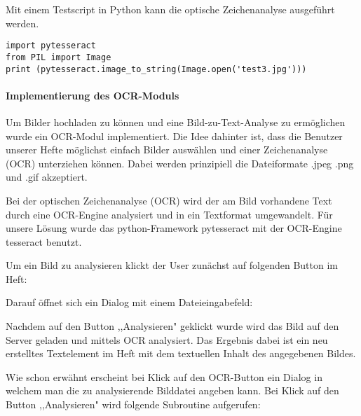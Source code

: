 Mit einem Testscript in Python kann die optische Zeichenanalyse ausgeführt werden.

\begin{lstlisting}[caption={pytesseract-Code}]
import pytesseract
from PIL import Image
print (pytesseract.image_to_string(Image.open('test3.jpg')))
\end{lstlisting}

\paragraph{Implementierung des OCR-Moduls}
Um Bilder hochladen zu können und eine Bild-zu-Text-Analyse zu ermöglichen wurde ein OCR-Modul implementiert. Die Idee dahinter ist, dass die Benutzer unserer Hefte möglichst einfach Bilder auswählen und einer Zeichenanalyse (OCR) unterziehen können. Dabei werden prinzipiell die Dateiformate .jpeg .png und .gif akzeptiert.

Bei der optischen Zeichenanalyse (OCR) wird der am Bild vorhandene Text durch eine OCR-Engine analysiert und in ein Textformat umgewandelt. Für unsere Lösung wurde das python-Framework pytesseract mit der OCR-Engine tesseract benutzt.

Um ein Bild zu analysieren klickt der User zunächst auf folgenden Button im Heft:


Darauf öffnet sich ein Dialog mit einem Dateieingabefeld:


Nachdem auf den Button ,,Analysieren" geklickt wurde wird das Bild auf den Server geladen und mittels OCR analysiert. Das Ergebnis dabei ist ein neu erstelltes Textelement im Heft mit dem textuellen Inhalt des angegebenen Bildes.

Wie schon erwähnt erscheint bei Klick auf den OCR-Button ein Dialog in welchem man die zu analysierende Bilddatei angeben kann. Bei Klick auf den Button ,,Analysieren" wird folgende Subroutine aufgerufen:

